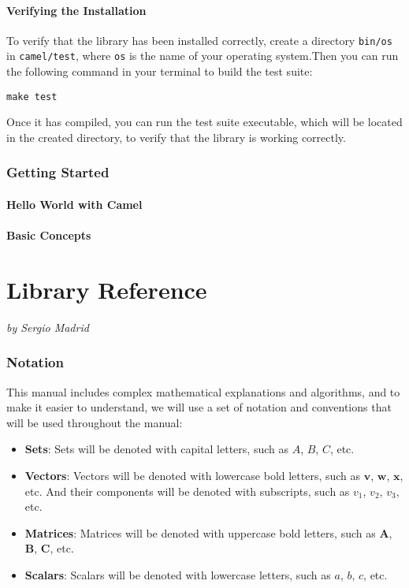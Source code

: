\documentclass[a4paper,oneside,10pt]{article}
\newcommand{\authoredpart}[2]{
  \clearpage
  \part{#1}
  \vspace{-1em} %
  \Large{\textit{by #2}}
  \vspace{2em} %
}
\theoremstyle{definition}
\begin{document}
\subsection{Verifying the Installation}

To verify that the library has been installed correctly, create a directory \texttt{bin/os} in \texttt{camel/test}, where \texttt{os} is the name of your operating system.Then you can run the following command in your terminal to build the test suite:

\begin{verbatim}
make test
\end{verbatim}

Once it has compiled, you can run the test suite executable, which will be located in the created directory, to verify that the library is working correctly.

\section{Getting Started}
\subsection{Hello World with Camel}
\subsection{Basic Concepts}


\authoredpart{Library Reference}{Sergio Madrid} \label{part:library_reference}

\section{Notation}

This manual includes complex mathematical explanations and algorithms, and to make it easier to understand, we will use a set of notation and conventions that will be used throughout the manual:
\begin{itemize}
  \item \textbf{Sets}: Sets will be denoted with capital letters, such as $A$, $B$, $C$, etc.
  \item \textbf{Vectors}: Vectors will be denoted with lowercase bold letters, such as $\mathbf{v}$, $\mathbf{w}$, $\mathbf{x}$, etc. And their components will be denoted with subscripts, such as $v_1$, $v_2$, $v_3$, etc.
  \item \textbf{Matrices}: Matrices will be denoted with uppercase bold letters, such as $\mathbf{A}$, $\mathbf{B}$, $\mathbf{C}$, etc.
  \item \textbf{Scalars}: Scalars will be denoted with lowercase letters, such as $a$, $b$, $c$, etc.
\end{itemize}
\end{document}
